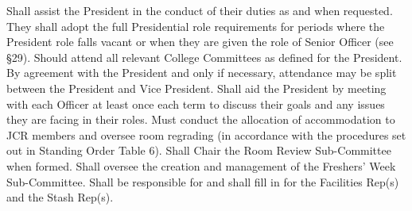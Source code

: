 Shall assist the President in the conduct of their duties as and when requested. They shall adopt the full Presidential role requirements for periods where the President role falls vacant or when they are given the role of Senior Officer (see §29).
Should attend all relevant College Committees as defined for the President. By agreement with the President and only if necessary, attendance may be split between the President and Vice President.
Shall aid the President by meeting with each Officer at least once each term to discuss their goals and any issues they are facing in their roles.
Must conduct the allocation of accommodation to JCR members and oversee room regrading (in accordance with the procedures set out in Standing Order Table 6). Shall Chair the Room Review Sub-Committee when formed.
Shall oversee the creation and management of the Freshers' Week Sub-Committee.
Shall be responsible for and shall fill in for the Facilities Rep(s) and the Stash Rep(s).
